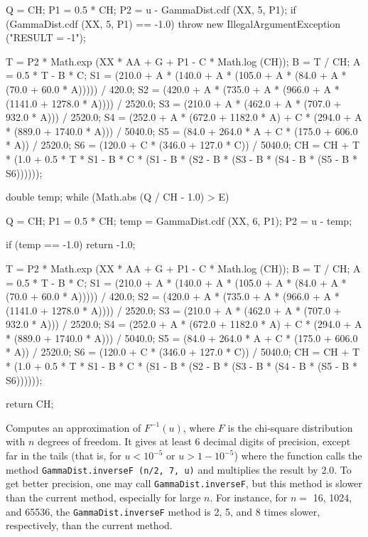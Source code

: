 \begin{code}
\begin{hide}
{      Q = CH;
      P1 = 0.5 * CH;
      P2 = u - GammaDist.cdf (XX, 5, P1);
      if (GammaDist.cdf (XX, 5, P1) == -1.0)
         throw new IllegalArgumentException ("RESULT = -1");

      T = P2 * Math.exp (XX * AA + G + P1 - C * Math.log (CH));
      B = T / CH;
      A = 0.5 * T - B * C;
      S1 = (210.0 + A * (140.0 +
            A * (105.0 + A * (84.0 + A * (70.0 + 60.0 * A))))) / 420.0;
      S2 = (420.0 + A * (735.0 + A * (966.0 + A * (1141.0 + 1278.0 * A))))
         / 2520.0;
      S3 = (210.0 + A * (462.0 + A * (707.0 + 932.0 * A))) / 2520.0;
      S4 = (252.0 + A * (672.0 + 1182.0 * A) +
         C * (294.0 + A * (889.0 + 1740.0 * A))) / 5040.0;
      S5 = (84.0 + 264.0 * A + C * (175.0 + 606.0 * A)) / 2520.0;
      S6 = (120.0 + C * (346.0 + 127.0 * C)) / 5040.0;
      CH = CH + T * (1.0 + 0.5 * T * S1 - B * C * (S1 - B * (S2 -
               B * (S3 - B * (S4 - B * (S5 - B * S6))))));

      double temp;
      while (Math.abs (Q / CH - 1.0) > E) {
         Q = CH;
         P1 = 0.5 * CH;
         temp = GammaDist.cdf (XX, 6, P1);
         P2 = u - temp;

         if (temp == -1.0)
            return -1.0;

         T = P2 * Math.exp (XX * AA + G + P1 - C * Math.log (CH));
         B = T / CH;
         A = 0.5 * T - B * C;
         S1 = (210.0 + A * (140.0 + A * (105.0 + A * (84.0 +
                     A * (70.0 + 60.0 * A))))) / 420.0;
         S2 = (420.0 + A * (735.0 + A * (966.0 + A * (1141.0 +
                     1278.0 * A)))) / 2520.0;
         S3 = (210.0 + A * (462.0 + A * (707.0 + 932.0 * A))) / 2520.0;
         S4 = (252.0 + A * (672.0 + 1182.0 * A) +
            C * (294.0 + A * (889.0 + 1740.0 * A))) / 5040.0;
         S5 = (84.0 + 264.0 * A + C * (175.0 + 606.0 * A)) / 2520.0;
         S6 = (120.0 + C * (346.0 + 127.0 * C)) / 5040.0;
         CH = CH + T * (1.0 + 0.5 * T * S1 - B * C * (S1 - B * (S2 -
                  B * (S3 - B * (S4 - B * (S5 - B * S6))))));
      }
      return CH;
   }\end{hide}
\end{code}
\begin{tabb}
  Computes an approximation of $F^{-1}(u)$, where $F$ is the
  chi-square distribution with $n$ degrees of freedom.
  It gives at least 6 decimal digits of precision, except far in the tails
  (that is, for $u< 10^{-5}$ or $u > 1 - 10^{-5}$) where the function
  calls the method \texttt{GammaDist.inverseF (n/2, 7, u)}  and
  multiplies the result by 2.0.
  To get better precision, one may
  call \texttt{GammaDist.inverseF}, but this method is slower than the
  current method, especially for large $n$. For instance, for $n = $ 16, 1024,
  and 65536, the \texttt{GammaDist.inverseF} method is 2, 5, and 8 times slower,
  respectively, than the current method.
\end{tabb}

